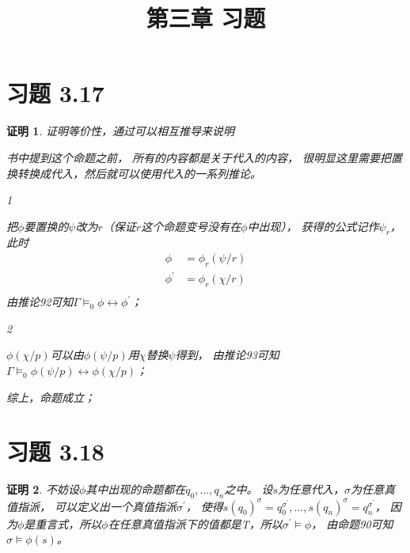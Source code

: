 \documentclass{article}
\theoremstyle{mystyle}
\theoremstyle{zproofstyle}
\newtheorem*{zproof}{证明}
\begin{document}
\title{第三章 习题}
\maketitle

\section*{习题 3.17}
\begin{zproof}
  证明等价性，通过可以相互推导来说明

  书中提到这个命题之前，
  所有的内容都是关于代入的内容，
  很明显这里需要把置换转换成代入，然后就可以使用代入的一系列推论。

  \textcircled{1}

  把$\phi$要置换的$\psi$改为$r$（保证$r$这个命题变号没有在$\phi$中出现），
  获得的公式记作$\psi_r$，此时
  \begin{align*}
    \phi        & = \phi_r(\psi/r)   \\
    \phi^\prime & = \phi_r(\chi / r) \\
  \end{align*}
  由推论92可知$\varGamma \models_0 \phi \leftrightarrow \phi^\prime$；

  \textcircled{2}
  
  $\phi (\chi / p)$可以由$\phi (\psi / p)$用$\chi$替换$\psi$得到，
  由推论93可知$\varGamma \models_0 \phi (\psi / p) \leftrightarrow \phi (\chi / p)$；

  综上，命题成立；

\end{zproof}

\section*{习题 3.18}
\begin{zproof}
  不妨设$\phi$其中出现的命题都在$q_0,...,q_n$之中。
  设$s$为任意代入，$\sigma$为任意真值指派，
  可以定义出一个真值指派$\sigma^\prime$，
  使得$s(q_0)^\sigma = q_0^{\sigma^\prime},...,s(q_n)^\sigma = q_n^{\sigma^\prime}$，
  因为$\phi$是重言式，所以$\phi$在任意真值指派下的值都是T，所以${\sigma^\prime} \models \phi$，
  由命题90可知$\sigma \models \phi(s)$。
\end{zproof}
\end{document}
